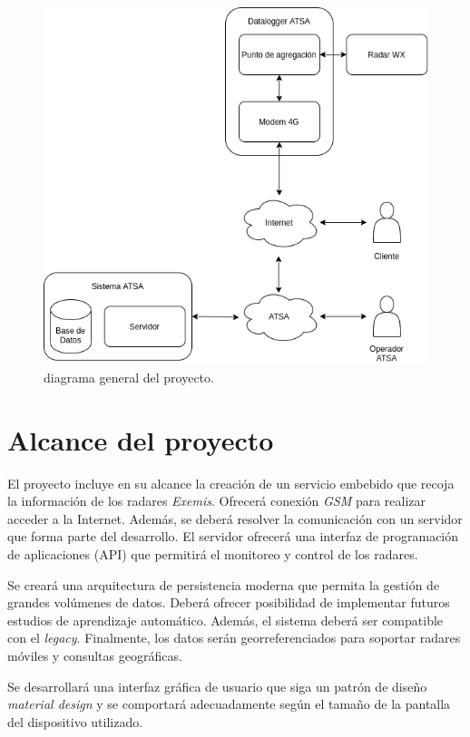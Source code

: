 \documentclass[
12pt,
spanish,
singlespacing,
parskip,
headsepline,]{article}
\begin{document}
\begin{figure}[h!]
	\centering
	\includegraphics[width=\textwidth]{Figuras/diagramaGeneral.png}
	\caption{diagrama general del proyecto.}
	\label{fig:general}
\end{figure}

\section{Alcance del proyecto}

El proyecto incluye en su alcance la creación de un servicio embebido que recoja la información de los radares \emph{Exemis}.
Ofrecerá conexión \emph{GSM} para realizar acceder a la Internet.
Además, se deberá resolver la comunicación con un servidor que forma parte del desarrollo.
El servidor ofrecerá una interfaz de programación de aplicaciones (API) que permitirá el monitoreo y control de los radares.

Se creará una arquitectura de persistencia moderna que permita la gestión de grandes volúmenes de datos.
Deberá ofrecer posibilidad de implementar futuros estudios de aprendizaje automático.
Además, el sistema deberá ser compatible con el \emph{legacy}.
Finalmente, los datos serán georreferenciados para soportar radares móviles y consultas geográficas.

Se desarrollará una interfaz gráfica de usuario que siga un patrón de diseño \emph{material design} y se comportará adecuadamente según el tamaño de la pantalla del dispositivo utilizado.
\end{document}
